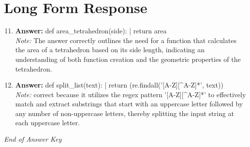 \documentclass[12pt]{article}
\begin{document}
\section*{Long Form Response}
\begin{enumerate}[label=\arabic*.]
\setcounter{enumi}{10}
\item \textbf{Answer:} def area\_tetrahedron(side): | return area
\\ \textit{Note:} The answer correctly outlines the need for a function that calculates the area of a tetrahedron based on its side length, indicating an understanding of both function creation and the geometric properties of the tetrahedron.
\item \textbf{Answer:} def split\_list(text): | return (re.findall('[A-Z][^A-Z]*', text))
\\ \textit{Note:} correct because it utilizes the regex pattern '[A-Z][^A-Z]*' to effectively match and extract substrings that start with an uppercase letter followed by any number of non-uppercase letters, thereby splitting the input string at each uppercase letter.
\end{enumerate}

\vfill
\noindent\textit{End of Answer Key}
\end{document}
